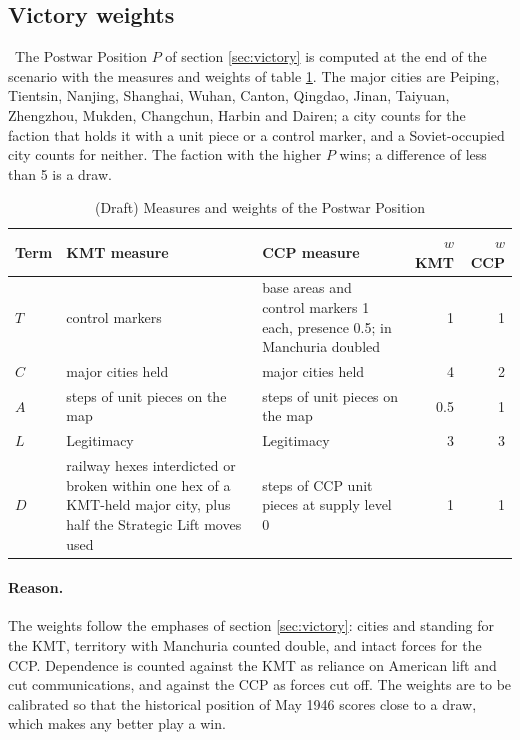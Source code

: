 \documentclass[11pt]{article}
\begin{document}
\subsection{Victory weights}\label{app:victory}
\draft\ The Postwar Position $P$ of section \ref{sec:victory} is computed at the end of the scenario with the measures and weights of table \ref{tab:weights}. The major cities are Peiping, Tientsin, Nanjing, Shanghai, Wuhan, Canton, Qingdao, Jinan, Taiyuan, Zhengzhou, Mukden, Changchun, Harbin and Dairen; a city counts for the faction that holds it with a unit piece or a control marker, and a Soviet-occupied city counts for neither. The faction with the higher $P$ wins; a difference of less than 5 is a draw.

\begin{table}[ht]
\centering\small
\begin{tabular}{@{}>{\raggedright\arraybackslash}p{}>{\raggedright\arraybackslash}p{}>{\raggedright\arraybackslash}p{}rr@{}}
\toprule
Term & KMT measure & CCP measure & $w$ KMT & $w$ CCP \\
\midrule
$T$ & control markers & base areas and control markers 1 each, presence 0.5; in Manchuria doubled & 1 & 1 \\
$C$ & major cities held & major cities held & 4 & 2 \\
$A$ & steps of unit pieces on the map & steps of unit pieces on the map & 0.5 & 1 \\
$L$ & Legitimacy & Legitimacy & 3 & 3 \\
$D$ & railway hexes interdicted or broken within one hex of a KMT-held major city, plus half the Strategic Lift moves used & steps of CCP unit pieces at supply level 0 & 1 & 1 \\
\bottomrule
\end{tabular}
\caption{(Draft) Measures and weights of the Postwar Position}\label{tab:weights}
\end{table}

\paragraph{Reason.} The weights follow the emphases of section \ref{sec:victory}: cities and standing for the KMT, territory with Manchuria counted double, and intact forces for the CCP. Dependence is counted against the KMT as reliance on American lift and cut communications, and against the CCP as forces cut off. The weights are to be calibrated so that the historical position of May 1946 scores close to a draw, which makes any better play a win.
\end{document}
